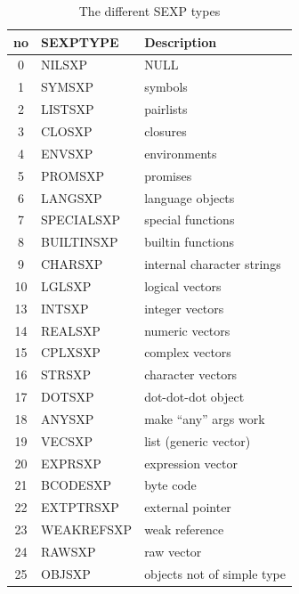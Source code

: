 \begin{table}[h!]
	\centering
	\begin{tabular}{c l l}
		\hline
		\textbf{no} & \textbf{SEXPTYPE} & \textbf{Description}       \\
		\hline
		0           & NILSXP            & NULL                       \\
		1           & SYMSXP            & symbols                    \\
		2           & LISTSXP           & pairlists                  \\
		3           & CLOSXP            & closures                   \\
		4           & ENVSXP            & environments               \\
		5           & PROMSXP           & promises                   \\
		6           & LANGSXP           & language objects           \\
		7           & SPECIALSXP        & special functions          \\
		8           & BUILTINSXP        & builtin functions          \\
		9           & CHARSXP           & internal character strings \\
		10          & LGLSXP            & logical vectors            \\
		13          & INTSXP            & integer vectors            \\
		14          & REALSXP           & numeric vectors            \\
		15          & CPLXSXP           & complex vectors            \\
		16          & STRSXP            & character vectors          \\
		17          & DOTSXP            & dot-dot-dot object         \\
		18          & ANYSXP            & make “any” args work       \\
		19          & VECSXP            & list (generic vector)      \\
		20          & EXPRSXP           & expression vector          \\
		21          & BCODESXP          & byte code                  \\
		22          & EXTPTRSXP         & external pointer           \\
		23          & WEAKREFSXP        & weak reference             \\
		24          & RAWSXP            & raw vector                 \\
		25          & OBJSXP            & objects not of simple type \\
		\hline
	\end{tabular}
	\caption{The different SEXP types\cite[1.1.1 SEXPTYPEs]{rprojectInternals}}\label{tbl:sexptype}
\end{table}

